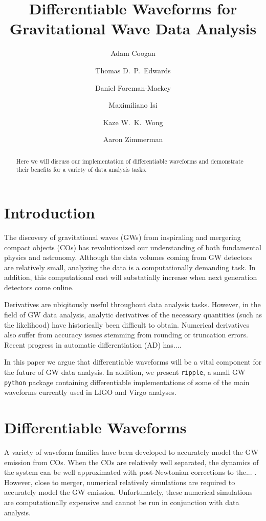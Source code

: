 \documentclass[twocolumn]{aastex631}
\begin{document}
\title{Differentiable Waveforms for Gravitational Wave Data Analysis}

\author{Adam Coogan}
\author{Thomas D.~P.~Edwards}
\author{Daniel Foreman-Mackey}
\author{Maximiliano Isi}
\author{Kaze W.~K.~Wong}
\author{Aaron Zimmerman}

\begin{abstract}
    Here we will discuss our implementation of differentiable waveforms and demonstrate their benefits for a variety of data analysis tasks.
\end{abstract}

\section{Introduction}
\label{sec:intro}

The discovery of gravitational waves (GWs) from inspiraling and mergering compact objects (COs) has revolutionized our understanding of both fundamental physics and astronomy.
Although the data volumes coming from GW detectors are relatively small, analyzing the data is a computationally demanding task.
In addition, this computational cost will substatially increase when next generation detectors come online.

Derivatives are ubiqitously useful throughout data analysis tasks.
However, in the field of GW data analysis, analytic derivatives of the necessary quantities (such as the likelihood) have historically been difficult to obtain.
Numerical derivatives also suffer from accuracy issues stemming from rounding or truncation errors.
Recent progress in automatic differentiation (AD) has.... \citep{Coogan:2022qxs}

In this paper we argue that differentiable waveforms will be a vital component for the future of GW data analysis.
In addition, we present \texttt{ripple}, a small GW \texttt{python} package containing differentiable implementations of some of the main waveforms currently used in LIGO and Virgo analyses.

\section{Differentiable Waveforms}
\label{sec:waveforms}

A variety of waveform families have been developed to accurately model the GW emission from COs. 
When the COs are relatively well separated, the dynamics of the system can be well approximated with post-Newtonian corrections to the... .
However, close to merger, numerical relatively simulations are required to accurately model the GW emission.
Unfortunately, these numerical simulations are computationally expensive and cannot be run in conjunction with data analysis.
\end{document}
